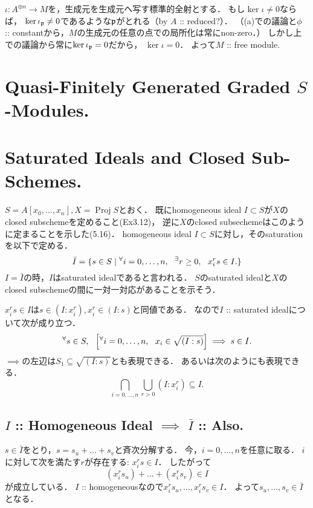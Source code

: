 \documentclass[a4paper]{jsarticle}
\newcommand{\Proj}{\operatorname{Proj}}
\begin{document}
    $\iota: A^{\oplus n} \to M$を，生成元を生成元へ写す標準的全射とする．
    もし$\ker \iota \neq 0$ならば，
    $\ker \iota_{\mathfrak{p}} \neq 0$であるような$\mathfrak{p}$がとれる（by $A$ :: reduced?）．
    （(a)での議論と$\phi$ :: constantから，$M$の生成元の任意の点での局所化は常にnon-zero．）
    しかし上での議論から常に$\ker \iota_{\mathfrak{p}}=0$だから，
    $\ker \iota=0$．
    よって$M$ :: free module.

\section{Quasi-Finitely Generated Graded $S$-Modules.} %

\section{Saturated Ideals and Closed Sub-Schemes.} %
    $S=A[x_0,\dots,x_n], X=\Proj S$とおく．
    既にhomogeneous ideal $I \subset S$が$X$のclosed subschemeを定めること(Ex3.12)，
    逆に$X$のclosed subsechemeはこのように定まることを示した(5.16)．
    homogeneous ideal $I \subset S$に対し，そのsaturationを以下で定める．
    \[ \bar{I}=\{s \in S \mid {}^{\forall} i=0,\dots,n,~~ {}^{\exists} r \geq 0,~~ x_i^r s \in I. \} \]
    $I=\bar{I}$の時，$I$はsaturated idealであると言われる．
    $S$のsaturated idealと$X$のclosed subschemeの間に一対一対応があることを示そう．

    \begin{Remark}
        $x_i^r s \in I$は$s \in (I:x_i^r), x_i^r \in (I:s)$と同値である．
        なので$I$ :: saturated idealについて次が成り立つ．
        \[ {}^{\forall} s \in S,~~ \left[{}^{\forall} i=0,\dots,n,~~ x_i \in \sqrt{(I:s)}\right]  \implies s \in I. \]
        $\implies$の左辺は$S_1 \subseteq \sqrt{(I:s)}$とも表現できる．
        あるいは次のようにも表現できる．
        \[ \bigcap_{i=0,\dots,n} \bigcup_{r>0} (I:x_i^r) \subseteq I. \]
    \end{Remark}

    \subsection{$I$ :: Homogeneous Ideal $\implies$ $\bar{I}$ :: Also.}
    $s \in \bar{I}$をとり，$s=s_u+\dots+s_v$と斉次分解する．
    今，$i=0,\dots,n$を任意に取る．
    $i$に対して次を満たす$r$が存在する: $x_i^r s \in I$．
    したがって
    \[ (x_i^r s_u)+\dots+(x_i^r s_v) \in I \]
    が成立している．
    $I$ :: homogeneousなので$x_i^r s_u,\dots,x_i^r s_v \in I$．
    よって$s_u,\dots,s_v \in \bar{I}$となる．
\end{document}
